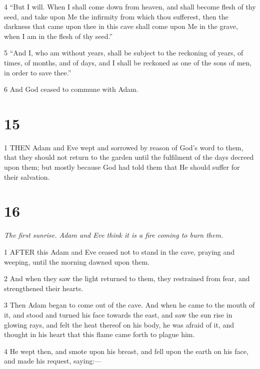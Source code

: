\par 4 “But I will. When I shall come down from heaven, and shall become flesh of thy seed, and take upon Me the infirmity from which thou sufferest, then the darkness that came upon thee in this cave shall come upon Me in the grave, when I am in the flesh of thy seed.”

\par 5 “And I, who am without years, shall be subject to the reckoning of years, of times, of months, and of days, and I shall be reckoned as one of the sons of men, in order to save thee.”

\par 6 And God ceased to commune with Adam.

\chapter{15}

\par 1 THEN Adam and Eve wept and sorrowed by reason of God's word to them, that they should not return to the garden until the fulfilment of the days decreed upon them; but mostly because God had told them that He should suffer for their salvation.

\chapter{16}

\par \textit{The first sunrise. Adam and Eve think it is a fire coming to burn them.}

\par 1 AFTER this Adam and Eve ceased not to stand in the cave, praying and weeping, until the morning dawned upon them.

\par 2 And when they saw the light returned to them, they restrained from fear, and strengthened their hearts.

\par 3 Then Adam began to come out of the cave. And when he came to the mouth of it, and stood and turned his face towards the east, and saw the sun rise in glowing rays, and felt the heat thereof on his body, he was afraid of it, and thought in his heart that this flame came forth to plague him.

\par 4 He wept then, and smote upon his breast, and fell upon the earth on his face, and made his request, saying:—

